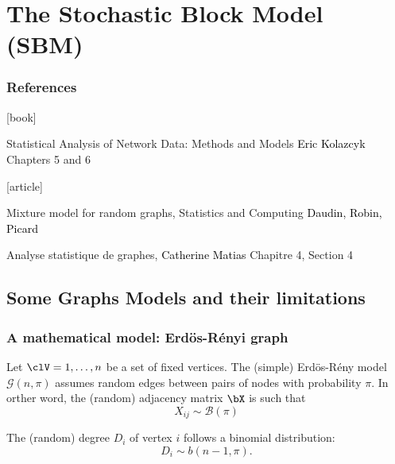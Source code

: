 \documentclass{beamer}\usepackage[]{graphicx}\usepackage[]{color}
\begin{document}
\section{The Stochastic Block Model (SBM)}

\begin{frame}
  \frametitle{References}

    \begin{thebibliography}{99}
      [book]

     Statistical Analysis of Network Data: Methods and Models
    \newblock \textcolor{black}{Eric Kolazcyk}
    \newblock \alert{Chapters 5 and 6}

      [article]

     Mixture model for random graphs, Statistics and Computing
    \newblock \textcolor{black}{Daudin, Robin, Picard}

     Analyse statistique de graphes,
    \newblock \textcolor{black}{Catherine Matias}
    \newblock \alert{Chapitre 4, Section 4}

    \end{thebibliography}

\end{frame}

\subsection{Some Graphs Models and their limitations}

\begin{frame}
  \frametitle{A mathematical model: Erdös-Rényi graph}

  \begin{definition}
    Let $\clV = {1,\dots,n}$ be a set of fixed vertices. The (simple) Erdös-Rény model $\mathcal{G}(n,\pi)$ assumes random edges between pairs of nodes with probability $\pi$. In orther word, the (random) adjacency matrix $\bX$ is such that
    \begin{equation*}
      X_{ij} \sim \mathcal{B}(\pi)
    \end{equation*}
  \end{definition}

  \vfill

  \begin{proposition}
    The (random) degree $D_i$ of vertex $i$ follows a binomial distribution:
      \begin{equation*}
        D_i \sim b(n-1, \pi).
      \end{equation*}
  \end{proposition}

\end{frame}
\end{document}
